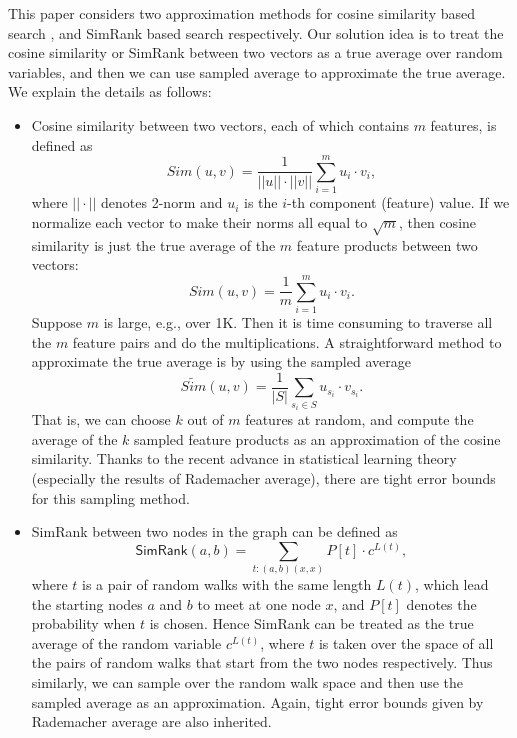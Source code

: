 \documentclass{article}
\begin{document}
This paper considers two approximation methods for cosine similarity based search \cite{SGM00,Xia16,ATY13,TAJY14}, and SimRank based search \cite{JW02,LH10,FNS13,KMK14} respectively. Our solution idea is to treat the cosine similarity or SimRank between two vectors as a true average over random variables, and then we can use sampled average to approximate the true average. We explain the details as follows:
\begin{itemize}
\item Cosine similarity between two vectors, each of which contains $m$ features, is defined as
$$Sim(u,v) = \frac{1}{||u||\cdot||v||} \sum_{i=1}^m u_i\cdot v_i,$$
where $||\cdot||$ denotes 2-norm and $u_i$ is the $i$-th component (feature) value. If we normalize each vector to make their norms all equal to $\sqrt{m}$, then cosine similarity is just the true average of the $m$ feature products between two vectors:
$$Sim(u,v) = \frac{1}{m} \sum_{i=1}^m u_i\cdot v_i.$$
Suppose $m$ is large, e.g., over 1K. Then it is time consuming to traverse all the $m$ feature pairs and do the multiplications. A straightforward method to approximate the true average is by using the sampled average
$$\widetilde{Sim}(u,v) = \frac{1}{|S|} \sum_{s_i\in S} u_{s_i}\cdot v_{s_i}.$$
That is, we can choose $k$ out of $m$ features at random, and compute the average of the $k$ sampled feature products as an approximation of the cosine similarity.
Thanks to the recent advance in statistical learning theory (especially the results of Rademacher average), there are tight error bounds for this sampling method.
\item SimRank between two nodes in the graph can be defined as
$$\textsf{SimRank}(a,b) = \sum_{t: (a,b) (x,x)} P[t]\cdot c^{L(t)},$$
where $t$ is a pair of random walks with the same length $L(t)$, which lead the starting nodes $a$ and $b$ to meet at one node $x$, and $P[t]$ denotes the probability when $t$ is chosen. Hence SimRank can be treated as the true average of the random variable $c^{L(t)}$, where $t$ is taken over the space of all the pairs of random walks that start from the two nodes respectively. Thus similarly, we can sample over the random walk space and then use the sampled average as an approximation. Again, tight error bounds given by Rademacher average are also inherited.
\end{itemize}
\end{document}
